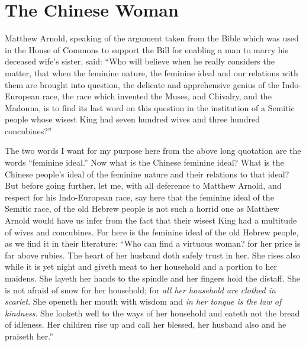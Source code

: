 
\chapter[The Chinese Woman]
{The Chinese Woman}

Matthew Arnold, speaking of the argument taken from the Bible
which was used in the House of Commons to support the Bill
for enabling a man to marry his deceased wife's sister, said:
``Who will believe when he really considers the matter, that when the feminine nature,
the feminine ideal and our relations with them are brought into question,
the delicate and apprehensive genius of the Indo-European race,
the race which invented the Muses, and Chivalry, and the Madonna,
is to find its last word on this question in the institution of a Semitic people
whose wisest King had seven hundred wives and three hundred concubines?''

The two words I want for my purpose here from the above long quotation are the words ``feminine ideal.''
Now what is the Chinese feminine ideal?
What is the Chinese people's ideal of the feminine nature and their relations to that ideal?
But before going further, let me, with all deference to Matthew Arnold,
and respect for his Indo-European race,
say here that the feminine ideal of the Semitic race,
of the old Hebrew people is not such a horrid one
as Matthew Arnold would have us infer from the fact
that their wisest King had a multitude of wives and concubines.
For here is the feminine ideal of the old Hebrew people,
as we find it in their literature:
``Who can find a virtuous woman?
for her price is far above rubies.
The heart of her husband doth safely trust in her.
She rises also while it is yet night and giveth meat to her household and a portion to her maidens.
She layeth her hands to the spindle and her fingers hold the distaff.
She is not afraid of snow for her household;
for \emph{all her household are clothed in scarlet}.
She openeth her mouth with wisdom and \emph{in her tongue is the law of kindness}.
She looketh well to the ways of her household and eateth not the bread of idleness.
Her children rise up and call her blessed,
her husband also and he praiseth her.''

